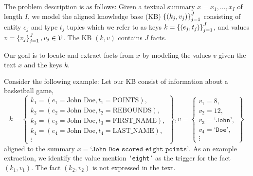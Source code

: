 \documentclass[12pt]{article}
\begin{document}
\begin{comment}
Note on related work:
Except for \citet{zeng2018copy}, prior work has either assumed that the locations of
entities and values are given as input features or that the locations of entities and values
are observed at training time.
\end{comment}

The problem description is as follows:
Given a textual summary $x = x_1, \ldots, x_{I}$ of length $I$,
we model the aligned knowledge base (KB) $\left\{(k_j, v_j)\right\}_{j=1}^J$
consisting of entity $e_j$ and type $t_j$ tuples
which we refer to as keys $k = \left\{(e_j, t_j)\right\}_{j=1}^J$,
and values $v = \left\{v_j\right\}_{j=1}^J, v_j \in \mathcal{V}$.
The KB $(k,v)$ contains $J$ facts.

Our goal is to locate and extract facts from $x$ by modeling the values $v$
given the text $x$ and the keys $k$.

\begin{comment}
Modeling only the KB $(k,v)$ given the text $x$
is not sufficient, as our goal is to locate fact mentions.
We assume the KB contains many more facts than those mentioned in the text.
This fits many scenarios in real world applications:
We may have many entity and type key pairs in our KB,
but a summary may discuss only a small, salient subset of players and statistics.
We therefore propose a model that first identifies words as value mentions,
aligns those mentions to an entity and relation type in order to obtain a fact, 
and then aggregates word-level decisions into a sequence-level decision to resolve conflicts.
\end{comment}

Consider the following example:
Let our KB consist of information about a basketball game,
$$
k = \left\{\begin{array}{c}
    k_1 = (e_1 = \textrm{John Doe}, t_1 = \textrm{POINTS}), \\
    k_2 = (e_2 = \textrm{John Doe}, t_2 = \textrm{REBOUNDS}), \\
    k_3 = (e_3 = \textrm{John Doe}, t_3 = \textrm{FIRST\_NAME}),\\
    k_4 = (e_4 = \textrm{John Doe}, t_4 = \textrm{LAST\_NAME}), \\
    \vdots
\end{array}\right\},
v = \left\{\begin{array}{c}
v_1 = 8,\\
v_2 = 12,\\
v_3 = \texttt{`John'},\\
v_4 = \texttt{`Doe'},\\
\vdots 
\end{array}\right\}
$$
aligned to the summary $x = \texttt{`John Doe scored eight points'}$.
As an example extraction, we identify the value mention
\texttt{`eight'} as the trigger for the fact $(k_1, v_1)$.
The fact $(k_2,v_2)$ is not expressed in the text.
\end{document}
